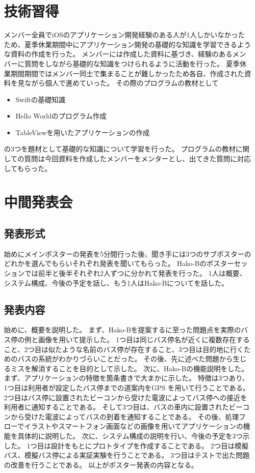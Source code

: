 \documentclass[openany,11pt,papersize]{jsbook}
\begin{document}

\section{技術習得}
メンバー全員でiOSのアプリケーション開発経験のある人が1人しかいなかったため、夏季休業期間中にアプリケーション開発の基礎的な知識を学習できるような資料の作成を行った。
メンバーには作成した資料に基づき、経験のあるメンバーに質問をしながら基礎的な知識をつけられるように活動を行った。
夏季休業期間期間ではメンバー同士で集まることが難しかったため各自、作成された資料を見ながら個人で進めていった。
その際のプログラムの教材として
\begin{itemize}

\item Swiftの基礎知識
\item Hello Worldのプログラム作成
\item TableViewを用いたアプリケーションの作成

\end{itemize}
の3つを題材として基礎的な知識について学習を行った。
プログラムの教材に関しての質問は今回資料を作成したメンバーをメンターとし、出てきた質問に対応してもらった。


\section{中間発表会}
\subsection{発表形式}
始めにメインポスターの発表を5分間行った後、聞き手には3つのサブポスターのどれかを選んでもらいそれぞれ発表を聞いてもらった。
Hako-Bのポスターセッションでは前半と後半それぞれ2人ずつに分かれて発表を行った。
1人は概要、システム構成、今後の予定を話し、もう1人はHako-Bについてを話した。


\subsection{発表内容}
始めに、概要を説明した。
まず、Hako-Bを提案するに至った問題点を実際のバス停の例と画像を用いて提示した。
1つ目は同じバス停名が近くに複数存在すること、2つ目は似たような名前のバス停が存在すること、3つ目は目的地に行くためのバスの系統がわかりづらいことだった。
その後、先に述べた問題から生じるミスを解消することを目的として示した。
次に、Hako-Bの機能説明をした。
まず、アプリケーションの特徴を箇条書きで大まかに示した。
特徴は3つあり、1つ目は利用者が設定したバス停までの道案内をGPS を用いて行うことである。
2つ目はバス停に設置されたビーコンから受けた電波によってバス停への接近を利用者に通知することである。
そして3つ目は、バスの車内に設置されたビーコンから受けた電波によってバスの到着を通知することである。
その後、処理フローでイラストやスマートフォン画面などの画像を用いてアプリケーションの機能を具体的に説明した。
次に、システム構成の説明を行い、今後の予定を3つ示した。
1つ目は設計をもとにプロトタイプを作成することである。
2つ目は模擬バス、模擬バス停による実証実験を行うことである。
3つ目はテストで出た問題の改善を行うことである。
以上がポスター発表の内容となる。
\end{document}
